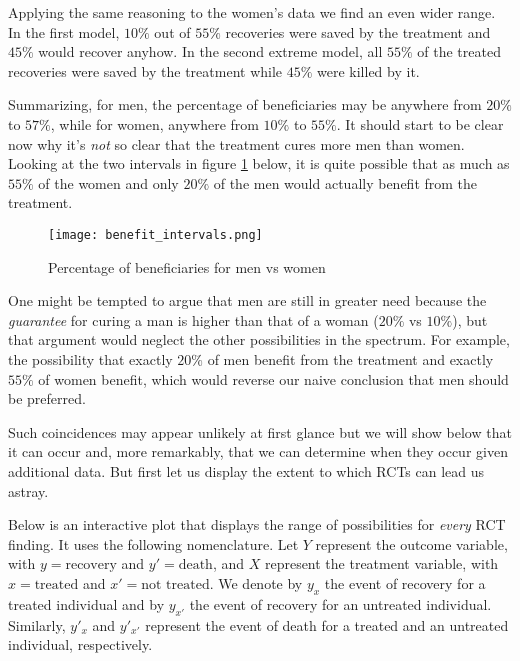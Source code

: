 \documentclass{article}
\begin{document}
Applying the same reasoning to the women's data we find an even wider range. In the first model, $10\%$ out of $55\%$ recoveries were saved by the treatment and $45\%$ would recover anyhow. In the second extreme model, all $55\%$ of the treated recoveries were saved by the treatment while $45\%$ were killed by it.

Summarizing, for men, the percentage of beneficiaries may be anywhere from $20\%$ to $57\%$, while for women, anywhere from $10\%$ to $55\%$. It should start to be clear now why it's \emph{not} so clear that the treatment cures more men than women. Looking at the two intervals in figure \ref{fig:intervals} below, it is quite possible that as much as $55\%$ of the women and only $20\%$ of the men would actually benefit from the treatment.

\begin{figure}[ht]
    \centering
    \texttt{[image: benefit\_intervals.png]}
    \caption{Percentage of beneficiaries for men vs women}
    \label{fig:intervals}
\end{figure}

One might be tempted to argue that men are still in greater need because the \emph{guarantee} for curing a man is higher than that of a woman ($20\%$ vs $10\%$), but that argument would neglect the other possibilities in the spectrum. For example, the possibility that exactly $20\%$ of men benefit from the treatment and exactly $55\%$ of women benefit, which would reverse our naive conclusion that men should be preferred.

Such coincidences may appear unlikely at first glance but we will show below that it can occur and, more remarkably, that we can determine when they occur given additional data. But first let us display the extent to which RCTs can lead us astray.

Below is an interactive plot that displays the range of possibilities for \emph{every} RCT finding.  It uses the following nomenclature. Let $Y$ represent the outcome variable, with $y = \text{recovery}$ and $y' = \text{death}$, and $X$ represent the treatment variable, with $x = \text{treated}$ and $x' = \text{not treated}$. We denote by $y_x$ the event of recovery for a treated individual and by $y_{x'}$ the event of recovery for an untreated individual. Similarly, $y'_x$ and $y'_{x'}$ represent the event of death for a treated and an untreated individual, respectively.
\end{document}
